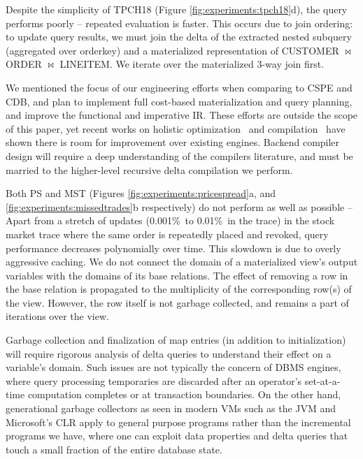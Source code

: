 Despite the simplicity of TPCH18 (Figure \ref{fig:experiments:tpch18}d), the query performs poorly -- repeated evaluation is faster.  This occurs due to join ordering: to update query results, we must join the delta of the extracted nested subquery (aggregated over orderkey) and a materialized representation of CUSTOMER $\bowtie$ ORDER $\bowtie$ LINEITEM.   
We iterate over the materialized 3-way join first.

We mentioned the focus of our engineering efforts when comparing to CSPE and CDB, and plan to implement full cost-based materialization and query planning, and improve the functional and imperative IR. These efforts are outside the scope of this paper, yet recent works on holistic optimization~\cite{krikellas-icde:10} and compilation~\cite{neumann-pvldb:11} have shown there is room for improvement over existing engines. Backend compiler design will require a deep understanding of the compilers literature, and must be married to the higher-level recursive delta compilation we perform.

Both PS and MST (Figures \ref{fig:experiments:pricespread}a, and \ref{fig:experiments:missedtrades}b respectively) do not perform as well as possible -- Apart from a stretch of updates (0.001\%\ to 0.01\%\ in the trace) in the stock market trace where the same order is repeatedly placed and revoked, query performance decreases polynomially over time.  This slowdown is due to overly aggressive caching.  We do not connect the domain of a materialized view's output variables with the domains of its base relations.  The effect of removing a row in the base relation is propagated to the multiplicity of the corresponding row(s) of the view.  However, the row itself is not garbage collected, and remains a part of iterations over the view.

Garbage collection and finalization of map entries (in addition to initialization) will require rigorous analysis of delta queries to understand their effect on a variable's domain. Such issues are not typically the concern of DBMS engines, where query processing temporaries are discarded after an operator's set-at-a-time computation completes or at transaction boundaries. On the other hand, generational garbage collectors as seen in modern VMs such as the JVM and Microsoft's CLR apply to general purpose programs rather than the incremental programs we have, where one can exploit data properties and delta queries that touch a small fraction of the entire database state.

